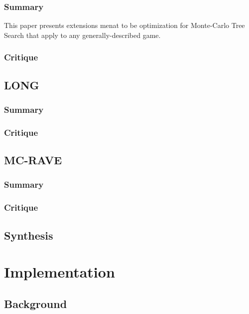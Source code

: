 \documentclass[letterpaper]{article}
\begin{document}
\subsubsection{Summary}
This paper presents extensions menat to be optimization for Monte-Carlo Tree Search that apply to any generally-described game.

\subsubsection{Critique}

\subsection{LONG}

\subsubsection{Summary}

\subsubsection{Critique}

\subsection{MC-RAVE}

\subsubsection{Summary}

\subsubsection{Critique}

\subsection{Synthesis}

\section{Implementation}

\subsection{Background}
\end{document}
